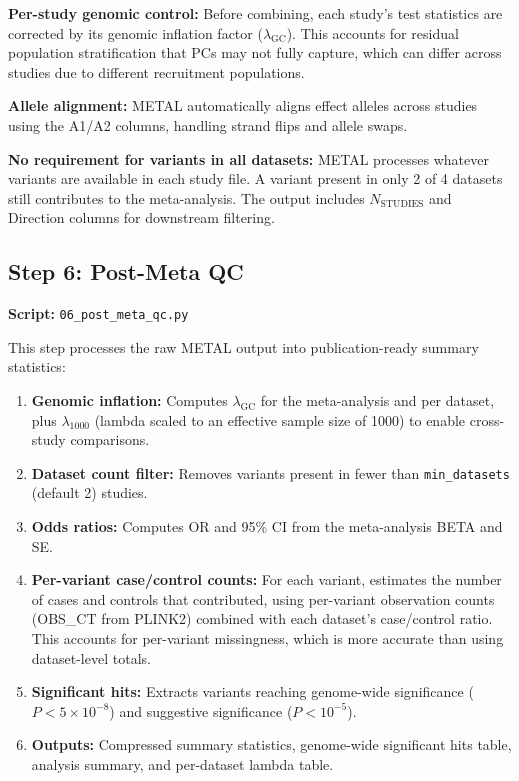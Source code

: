 \documentclass[11pt,letterpaper]{article}
\begin{document}
\textbf{Per-study genomic control:} Before combining, each study's test statistics are corrected by its genomic inflation factor ($\lambda_\text{GC}$). This accounts for residual population stratification that PCs may not fully capture, which can differ across studies due to different recruitment populations.

\textbf{Allele alignment:} METAL automatically aligns effect alleles across studies using the A1/A2 columns, handling strand flips and allele swaps.

\textbf{No requirement for variants in all datasets:} METAL processes whatever variants are available in each study file. A variant present in only 2 of 4 datasets still contributes to the meta-analysis. The output includes $N_\text{STUDIES}$ and Direction columns for downstream filtering.

\subsection{Step 6: Post-Meta QC}
\label{sec:step6}

\textbf{Script:} \texttt{06\_post\_meta\_qc.py}

This step processes the raw METAL output into publication-ready summary statistics:

\begin{enumerate}[nosep]
    \item \textbf{Genomic inflation:} Computes $\lambda_\text{GC}$ for the meta-analysis and per dataset, plus $\lambda_{1000}$ (lambda scaled to an effective sample size of 1000) to enable cross-study comparisons.
    \item \textbf{Dataset count filter:} Removes variants present in fewer than \texttt{min\_datasets} (default 2) studies.
    \item \textbf{Odds ratios:} Computes OR and 95\% CI from the meta-analysis BETA and SE.
    \item \textbf{Per-variant case/control counts:} For each variant, estimates the number of cases and controls that contributed, using per-variant observation counts (OBS\_CT from PLINK2) combined with each dataset's case/control ratio. This accounts for per-variant missingness, which is more accurate than using dataset-level totals.
    \item \textbf{Significant hits:} Extracts variants reaching genome-wide significance ($P < 5 \times 10^{-8}$) and suggestive significance ($P < 10^{-5}$).
    \item \textbf{Outputs:} Compressed summary statistics, genome-wide significant hits table, analysis summary, and per-dataset lambda table.
\end{enumerate}
\end{document}
